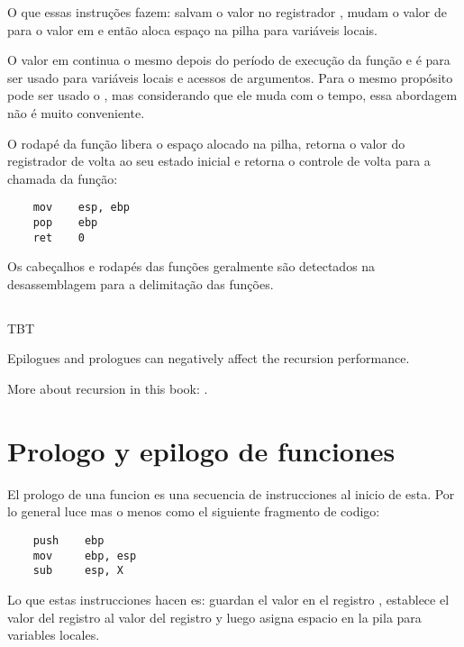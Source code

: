 O que essas instruções fazem: salvam o valor no registrador \EBP, mudam o valor de \EBP para o valor em \ESP e então aloca espaço na pilha para variáveis locais.

O valor em \EBP continua o mesmo depois do período de execução da função e é para ser usado para variáveis locais e acessos de argumentos.
Para o mesmo propósito pode ser usado o \ESP, mas considerando que ele muda com o tempo, essa abordagem não é muito conveniente.

O rodapé da função libera o espaço alocado na pilha, retorna o valor do registrador \EBP de volta ao seu estado inicial e retorna o controle de volta para a chamada da função:

\begin{lstlisting}
    mov    esp, ebp
    pop    ebp
    ret    0
\end{lstlisting}

Os cabeçalhos e rodapés das funções geralmente são detectados na desassemblagem para a delimitação das funções.

\ifx\LITE\undefined
\section{\Recursion}

\ac{TBT}

\index{\Recursion}
Epilogues and prologues can negatively affect the recursion performance.

More about recursion in this book: .
\fi %
\fi %

\ifdefined\SPANISH
\chapter{Prologo y epilogo de funciones}
\label{sec:prologepilog}
\index{\ESph{}} %
\index{\ESph{}} %

El prologo de una funcion es una secuencia de instrucciones al inicio de esta.
Por lo general luce mas o menos como el siguiente fragmento de codigo:

\begin{lstlisting}
    push    ebp
    mov     ebp, esp
    sub     esp, X
\end{lstlisting}

Lo que estas instrucciones hacen es: guardan el valor en el registro \EBP, establece el valor del registro \EBP al valor del registro \ESP y luego asigna espacio en la pila para variables locales.

